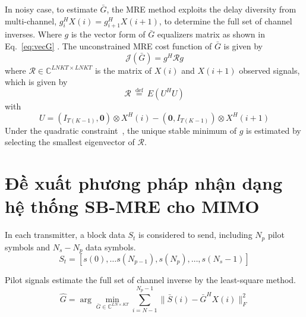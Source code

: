 In noisy case, to estimate $\bar{G}$, the MRE method exploits the delay diversity from multi-channel, $g_i^H X(i) = g_{i+1}^H X(i+1)$, to determine the full set of channel inverses. Where $g$ is the vector form of $\bar{G}$ equalizers matrix as shown in Eq.~\ref{eq:vecG} . The unconstrained MRE cost function of $\bar{G}$ is given by
\begin{equation}
    \mathcal{J}(\bar{G})=g^H \mathcal{R}g
\end{equation}
where $\mathcal{R} \in \mathbb{C}^{LNKT \times LNKT}$ is the matrix of $X(i)$ and $X(i+1)$ observed signals, which is given by
\begin{equation}
\label{eq:R}
\mathcal{R} \stackrel{\text { def }}{=} E\left(U^{H} U\right)
\end{equation}
with
\begin{equation}
\label{eq:U}
U = \left(I_{T (K-1)}, \mathbf{0}\right) \otimes X^{H}(i)-\left(\mathbf{0}, I_{T (K-1)}\right) \otimes X^{H}(i+1)
\end{equation}
Under the quadratic constraint~\cite{original}, the unique stable minimum of $g$ is estimated by selecting the smallest eigenvector of $\mathcal{R}$.


\section{Đề xuất phương pháp nhận dạng hệ thống SB-MRE cho MIMO}


In each transmitter, a block data $S_t$ is considered to send, including $N_p$ pilot symbols and $N_s - N_p$ data symbols.
\begin{equation}
S_t = \left[s(0), \ldots s\left(N_{p-1}\right), s\left(N_p\right), \ldots, s\left(N_s-1\right)\right]
\end{equation}

Pilot signals estimate the full set of channel inverse by the least-square method.
\begin{equation}
    \hat{G} = \arg \underset{\bar{G} \in \mathbb{C}^{LN \times KT}}{\min} \sum_{i=N-1}^{N_{p} - 1}\|\bar{S}(i)- \bar{G}^H X(i)\|_F^2 
\end{equation}

